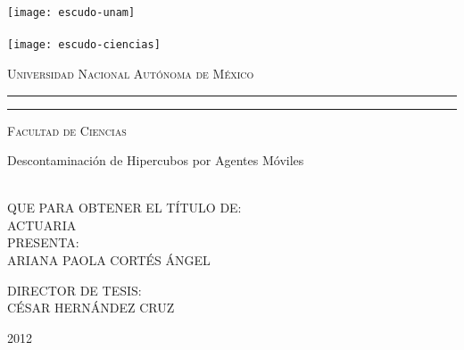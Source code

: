 


\newcommand{\titulo}[1]{\def\eltitulo{#1}}
\newcommand{\carrera}[1]{\def\lacarrera{#1}}
\newcommand{\nombre}[1]{\def\elnombre{#1}}    %
\newcommand{\director}[1]{\def\eldirector{#1}}  %
\newcommand{\fecha}[1]{\def\lafecha{#1}}

\titulo{Descontaminaci\'on de Hipercubos por Agentes M\'oviles}
\nombre{\uppercase{ARIANA PAOLA CORT\'ES \'ANGEL}}
\carrera{ACTUARIA}
\director{\uppercase{C\'ESAR HERN\'ANDEZ CRUZ}}
\fecha{2012}


\thispagestyle{empty}

\hskip-1.5cm
\begin{minipage}[c][10cm][s]{3cm} 
  \begin{center}
    \texttt{[image: escudo-unam]}\\[10pt]
    \hskip2pt\vrule width2pt height13cm\hskip1mm
    \vrule width1pt height13cm\\[10pt]
    \texttt{[image: escudo-ciencias]}
  \end{center}
\end{minipage}\quad
\begin{minipage}[c][9.5cm][s]{10cm}
  \begin{center}
    {\large \scshape Universidad Nacional Aut\'onoma de M\'exico}
    \vspace{.3cm}
    \hrule height2pt
    \vspace{.1cm}
    \hrule height1pt
    \vspace{.3cm}
    {\scshape Facultad de Ciencias}

    \vspace{3cm}

    {\Large \eltitulo}

    \vspace{3cm}

    \\[8pt]
    QUE PARA OBTENER EL T\'ITULO DE:\\[3pt]
    \mbox{}\lacarrera\\[13pt]
    PRESENTA:\\[3pt]
    \elnombre

    \vspace{2cm}

    {\small DIRECTOR DE TESIS:\\ \eldirector}

    \vspace{2cm}

    \lafecha
    
  \end{center}
\end{minipage}

